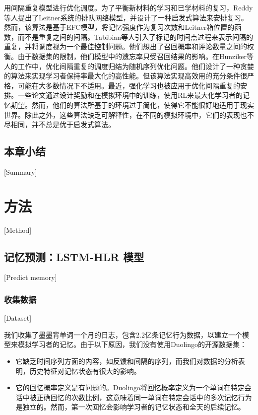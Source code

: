 用间隔重复模型进行优化调度。为了平衡新材料的学习和已学材料的复习，Reddy等人\cite{reddyUnboundedHumanLearning2016}提出了Leitner系统\cite{leitnerLerntManLeben1974}的排队网络模型，并设计了一种启发式算法来安排复习。然而，该算法是基于EFC模型\cite{reddyUnboundedHumanLearning2016}，将记忆强度作为复习次数和Leitner箱位置的函数，而不是重复之间的间隔。Tabibian等人\cite{tabibianEnhancingHumanLearning2019}引入了标记的时间点过程来表示间隔的重复，并将调度视为一个最佳控制问题。他们想出了召回概率和评论数量之间的权衡。由于数据集的限制，他们模型中的遗忘率只受召回结果的影响。在Hunziker等人\cite{hunzikerTeachingMultipleConcepts2019}的工作中，优化间隔重复的调度归结为随机序列优化问题。他们设计了一种贪婪的算法来实现学习者保持率最大化的高性能。但该算法实现高效用的充分条件很严格，可能在大多数情况下不适用。最近，强化学习也被应用于优化间隔重复的安排。一些论文\cite{reddyAcceleratingHumanLearning2017,upadhyayDeepReinforcementLearning2018,sinhaUsingDeepReinforcement2019,yangTADSLearningTimeaware2020}通过设计奖励和在模拟环境中的训练，使用RL来最大化学习者的记忆期望。然而，他们的算法所基于的环境过于简化，使得它不能很好地适用于现实世界。除此之外，这些算法缺乏可解释性，在不同的模拟环境中，它们的表现也不尽相同，并不总是优于启发式算法。

\section{本章小结}[Summary]

\chapter{方法}[Method]

\section{记忆预测：LSTM-HLR 模型}[Predict memory]

\subsection{收集数据}[Dataset]

我们收集了墨墨背单词一个月的日志，包含2.2亿条记忆行为数据，以建立一个模型来模拟学习者的记忆。由于以下原因，我们没有使用Duolingo的开源数据集：

\begin{itemize}
    \item 它缺乏时间序列方面的内容，如反馈和间隔的序列，而我们对数据的分析表明，历史特征对记忆状态有很大的影响。
    \item 它的回忆概率定义是有问题的。Duolingo将回忆概率定义为一个单词在特定会话中被正确回忆的次数比例，这意味着同一单词在特定会话中的多次记忆行为是独立的。然而，第一次回忆会影响学习者的记忆状态和全天的后续记忆。
\end{itemize}

